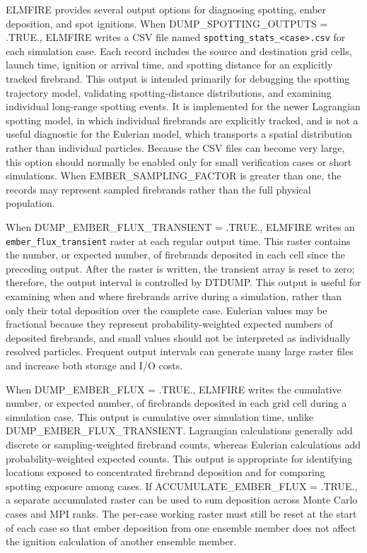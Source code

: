 ELMFIRE provides several output options for diagnosing spotting, ember deposition, and spot ignitions. When DUMP\_SPOTTING\_OUTPUTS = .TRUE., ELMFIRE writes a CSV file named \texttt{spotting\_stats\_<case>.csv} for each simulation case. Each record includes the source and destination grid cells, launch time, ignition or arrival time, and spotting distance for an explicitly tracked firebrand. This output is intended primarily for debugging the spotting trajectory model, validating spotting-distance distributions, and examining individual long-range spotting events. It is implemented for the newer Lagrangian spotting model, in which individual firebrands are explicitly tracked, and is not a useful diagnostic for the Eulerian model, which transports a spatial distribution rather than individual particles. Because the CSV files can become very large, this option should normally be enabled only for small verification cases or short simulations. When EMBER\_SAMPLING\_FACTOR is greater than one, the records may represent sampled firebrands rather than the full physical population.

When DUMP\_EMBER\_FLUX\_TRANSIENT = .TRUE., ELMFIRE writes an \texttt{ember\_flux\_transient} raster at each regular output time. This raster contains the number, or expected number, of firebrands deposited in each cell since the preceding output. After the raster is written, the transient array is reset to zero; therefore, the output interval is controlled by DTDUMP. This output is useful for examining when and where firebrands arrive during a simulation, rather than only their total deposition over the complete case. Eulerian values may be fractional because they represent probability-weighted expected numbers of deposited firebrands, and small values should not be interpreted as individually resolved particles. Frequent output intervals can generate many large raster files and increase both storage and I/O costs.

When DUMP\_EMBER\_FLUX = .TRUE., ELMFIRE writes the cumulative number, or expected number, of firebrands deposited in each grid cell during a simulation case. This output is cumulative over simulation time, unlike DUMP\_EMBER\_FLUX\_TRANSIENT. Lagrangian calculations generally add discrete or sampling-weighted firebrand counts, whereas Eulerian calculations add probability-weighted expected counts. This output is appropriate for identifying locations exposed to concentrated firebrand deposition and for comparing spotting exposure among cases. If ACCUMULATE\_EMBER\_FLUX = .TRUE., a separate accumulated raster can be used to sum deposition across Monte Carlo cases and MPI ranks. The per-case working raster must still be reset at the start of each case so that ember deposition from one ensemble member does not affect the ignition calculation of another ensemble member.

